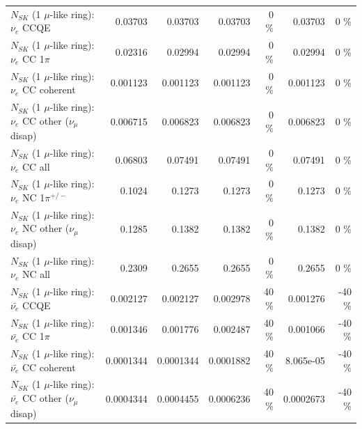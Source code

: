 \begin{table}
\begin{tabular}{| l | r | r | r  r | r  r |}
\hline
\hline
\hline
                                      $N_{SK}$ (1 $\mu$-like ring): $\nu_e$ CCQE &         0.03703 &         0.03703 &         0.03703 &        0 \%  &         0.03703 &        0 \%  \\ 
                                 $N_{SK}$ (1 $\mu$-like ring): $\nu_e$ CC 1$\pi$ &         0.02316 &         0.02994 &         0.02994 &        0 \%  &         0.02994 &        0 \%  \\ 
                               $N_{SK}$ (1 $\mu$-like ring): $\nu_e$ CC coherent &        0.001123 &        0.001123 &        0.001123 &        0 \%  &        0.001123 &        0 \%  \\ 
                $N_{SK}$ (1 $\mu$-like ring): $\nu_e$ CC other ($\nu_\mu$ disap) &        0.006715 &        0.006823 &        0.006823 &        0 \%  &        0.006823 &        0 \%  \\ 
                                  $N_{SK}$ (1 $\mu$-like ring): $\nu_{e}$ CC all &         0.06803 &         0.07491 &         0.07491 &        0 \%  &         0.07491 &        0 \%  \\ 
\hline
                           $N_{SK}$ (1 $\mu$-like ring): $\nu_e$ NC 1$\pi^{+/-}$ &          0.1024 &          0.1273 &          0.1273 &        0 \%  &          0.1273 &        0 \%  \\ 
                $N_{SK}$ (1 $\mu$-like ring): $\nu_e$ NC other ($\nu_\mu$ disap) &          0.1285 &          0.1382 &          0.1382 &        0 \%  &          0.1382 &        0 \%  \\ 
                                  $N_{SK}$ (1 $\mu$-like ring): $\nu_{e}$ NC all &          0.2309 &          0.2655 &          0.2655 &        0 \%  &          0.2655 &        0 \%  \\ 
\hline
\hline
\hline
                                $N_{SK}$ (1 $\mu$-like ring): $\bar{\nu_e}$ CCQE &        0.002127 &        0.002127 &        0.002978 &       40 \%  &        0.001276 &      -40 \%  \\ 
                           $N_{SK}$ (1 $\mu$-like ring): $\bar{\nu_e}$ CC 1$\pi$ &        0.001346 &        0.001776 &        0.002487 &       40 \%  &        0.001066 &      -40 \%  \\ 
                         $N_{SK}$ (1 $\mu$-like ring): $\bar{\nu_e}$ CC coherent &       0.0001344 &       0.0001344 &       0.0001882 &       40 \%  &       8.065e-05 &      -40 \%  \\ 
          $N_{SK}$ (1 $\mu$-like ring): $\bar{\nu_e}$ CC other ($\nu_\mu$ disap) &       0.0004344 &       0.0004455 &       0.0006236 &       40 \%  &       0.0002673 &      -40 \%  \\ 

\end{tabular}
\end{table}
